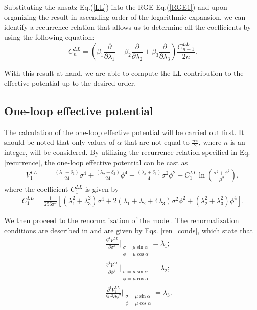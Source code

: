\documentclass[11pt,a4paper,english,superscriptaddress,preprint,aps,prd]{revtex4}
\begin{document}
Substituting the ansatz Eq.(\ref{LL}) into the RGE Eq.(\ref{RGE1}) and upon organizing the result in ascending order of the logarithmic expansion, we can identify a recurrence relation that allows us to determine all the coefficients by using the following equation:
\begin{equation}\label{recurrence}
 C_{n}^{LL}=\left(\beta_1\frac{\partial}{\partial \lambda_1}+\beta_2\frac{\partial}{\partial \lambda_2}+\beta_3\frac{\partial}{\partial \lambda_3}\right)\frac{C_{n-1}^{LL}}{2n}.
\end{equation}

\noindent With this result at hand, we are able to compute the LL contribution to the effective potential up to the desired order.

\subsection{One-loop effective potential}

The calculation of the one-loop effective potential will be carried out first. It should be noted that only values of $\alpha$ that are not equal to $\frac{n\pi}{2}$, where $n$ is an integer, will be considered. By utilizing the recurrence relation specified in Eq.\eqref{recurrence}, the one-loop effective potential can be cast as
\begin{eqnarray}\label{veffLL1l}
V^{LL}_{1}&=&\frac{(\lambda_1+\delta_1)}{24}\sigma ^4+\frac{(\lambda_2+\delta_2)}{24}\phi^4+\frac{(\lambda_3+\delta_3)}{4} \sigma^2 \phi^2+C_1^{LL}\ln \left(\frac{\sigma ^2+\phi ^2}{\mu ^2}\right),
\end{eqnarray}
\noindent where the coefficient $C_1^{LL}$ is given by
\begin{eqnarray}\label{c1LL}
C_1^{LL}=\frac{1}{256 \pi ^2}\left[ \left(\lambda_1^2+\lambda_3^2\right)\sigma^4+2 (\lambda_1+\lambda_2+4 \lambda_3)\sigma^2 \phi^2+\left(\lambda_2^2+\lambda_3^2\right)\phi^4\right].
\end{eqnarray}

We then proceed to the renormalization of the model. The renormalization conditions are described in \cite{Gildener:1976ih} and are given by Eqs. \eqref{ren_conds}, which state that
\begin{subequations}\label{ren_conds}
\begin{eqnarray}
 && \frac{\partial^4V^{LL}_1}{\partial\sigma^4}\Bigr |_{\substack{\sigma=\mu\sin\alpha\\\phi=\mu\cos\alpha}}=\lambda_1;\\
 && \frac{\partial^4V^{LL}_1}{\partial\phi^4}\Bigr |_{\substack{\sigma=\mu\sin\alpha\\\phi=\mu\cos\alpha}}=\lambda_2;\\
 && \frac{\partial^4V^{LL}_1}{\partial\sigma^2\partial\phi^2}\Bigr |_{\substack{\sigma=\mu\sin\alpha\\\phi=\mu\cos\alpha}}=\lambda_3.
\end{eqnarray}
\end{subequations}
\end{document}

